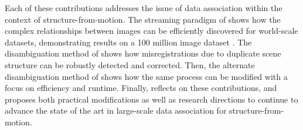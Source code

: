 Each of these contributions addresses the issue of data association within the context of structure-from-motion.
The streaming paradigm of  shows how the complex relationships between images can be efficiently discovered for world-scale datasets, demonstrating results on a 100 million image dataset \cite{yahoo_100m, thomee2015_data_challenges}.
The disambiguation method of  shows how misregistrations due to duplicate scene structure can be robustly detected and corrected.
Then, the alternate disambiguation method of  shows how the same process can be modified with a focus on efficiency and runtime.
Finally,  reflects on these contributions, and proposes both practical modifications as well as research directions to continue to advance the state of the art in large-scale data association for structure-from-motion.
